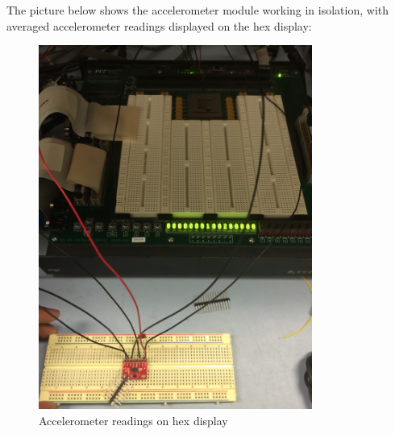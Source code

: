 \documentclass{article}
\begin{document}
The picture below shows the accelerometer module working in isolation, with averaged accelerometer readings displayed on the hex display:
\begin{center}
\begin{figure}[H]
\label{fig:acc_reading}
\caption{Accelerometer readings on hex display}
\centering
\includegraphics[width=0.8\textwidth, angle=270]{./img/accel-complete}
\end{figure}
\end{center}
\end{document}
